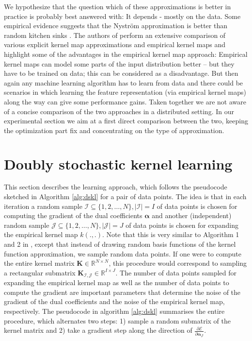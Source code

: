 \documentclass{article} %
\newcommand{\R}{\ensuremath{\mathds{R}}}
\newcommand{\va}{\boldsymbol{\alpha}}
\renewcommand{\vec}[1]{\mathbf{#1}}
\begin{document}
We hypothesize that the question which of these approximations is better in practice is probably best answered with: It depends - mostly on the data. 
Some empirical evidence suggests that the Nystr\"om approximation is better than random kitchen sinks \cite{Yang2012}. The authors of \cite{Vedaldi2010} perform an extensive comparison of various explicit kernel map approximations and empirical kernel maps and highlight some of the advantages in the empirical kernel map approach: Empirical kernel maps can model some parts of the input distribution better -- but they have to be trained on data; this can be considered as a disadvantage. But then again any machine learning algorithm has to learn from data and there could be scenarios in which learning the feature representation (via empirical kernel maps) along the way can give some performance gains. Taken together we are not aware of a concise comparison of the two approaches in a distributed setting. In our experimental section we aim at a first direct comparison between the two, keeping the optimization part fix and concentrating on the type of approximation. 
%
\section{Doubly stochastic kernel learning}\label{sec:dskl}
This section describes the learning approach, which follows the pseudocode sketched in Algorithm \autoref{alg:dskl} for a pair of data points. The idea is that in each iteration a random sample $\mathcal{I}\subseteq\{1,2,\dots,N\}, |\mathcal{I}|=I$ of data points is chosen for computing the gradient of the dual coefficients $\va$ and another (independent) random sample  $\mathcal{J}\subseteq\{1,2,\dots,N\}, |\mathcal{J}|=J$ of data points is chosen for expanding the empirical kernel map $k(.,.)$. Note that this is very similar to Algorithm 1 and 2 in \cite{Dai2014}, except that instead of drawing random basis functions of the kernel function approximation, we sample random data points. If one were to compute the entire kernel matrix $\vec{K}\in\R^{N\times N}$, this procedure would correspond to sampling a rectangular submatrix $\vec{K}_{\mathcal{I,J}}\in\R^{I\times J}$. The number of data points sampled for expanding the empirical kernel map as well as the number of data points to compute the gradient are important parameters that determine the noise of the gradient of the dual coefficients and the noise of the empirical kernel map, respectively. The pseudocode in algorithm \autoref{alg:dskl} summarises the entire procedure, which alternates two steps: 1) sample a random submatrix of the kernel matrix and 2) take a gradient step along the direction of $\frac{\partial\mathcal{E}}{\partial \va_{\mathcal{J}}}$.
\end{document}
